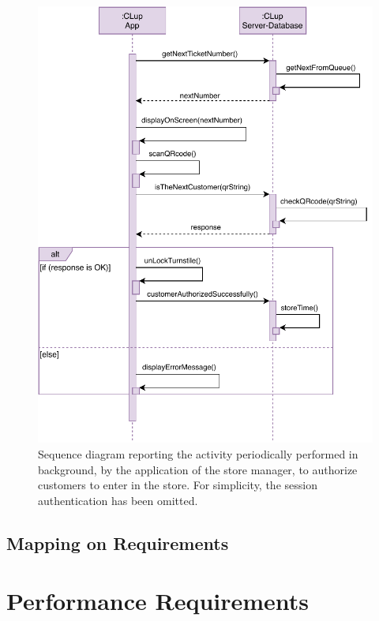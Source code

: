 \begin{figure}[H]
	\centering
	\includegraphics[width=1.0\textwidth]{images/authorizationToEnter_sequence_diagram.pdf}
	\caption{Sequence diagram reporting the activity periodically performed in background, by the application of the store manager, to authorize customers to enter in the store. For simplicity, the session authentication has been omitted.}
\end{figure}

\subsection{Mapping on Requirements}

\section{Performance Requirements}

